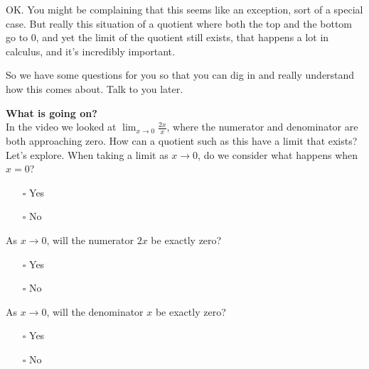 \documentclass[pdftex, brazil, 12pt, twoside]{article}
\begin{document}
\begin{figure}[H]
  \begin{center}
  \end{center}
\end{figure}

OK.
You might be complaining that this
seems like an exception, sort of a special case.
But really this situation of a quotient where
both the top and the bottom go to $0$, and yet
the limit of the quotient still exists,
that happens a lot in calculus, and it's incredibly important.

So we have some questions for you
so that you can dig in and really understand
how this comes about.
Talk to you later.

\begin{exercise}
  \textbf{What is going on?}\\
  In the video we looked at $\displaystyle \lim_{x \to 0}\frac{2x}{x}$, where the
  numerator and denominator are both approaching zero. How can a quotient such as
  this have a limit that exists? Let's explore.
  When taking a limit as $x \to 0$, do we consider what happens when $x = 0$?
  \begin{itemize}[noitemsep]
  \item[$\square$] Yes
  \item[$\square$] No
  \end{itemize}
  As $x \to 0$, will the numerator $2x$ be exactly zero?
  \begin{itemize}[noitemsep]
  \item[$\square$] Yes
  \item[$\square$] No
  \end{itemize}
  As $x \to 0$, will the denominator $x$ be exactly zero?
  \begin{itemize}[noitemsep]
  \item[$\square$] Yes
  \item[$\square$] No
  \end{itemize}
\end{exercise}
\end{document}
